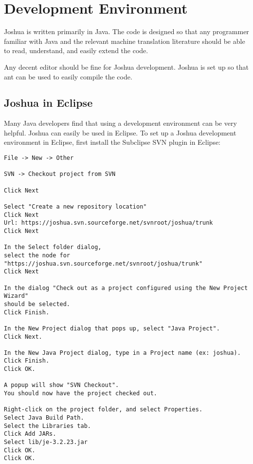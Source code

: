 \section{Development Environment}

Joshua is written primarily in Java. The code is designed so that any programmer familiar with Java and the relevant machine translation literature should be able to read, understand, and easily extend the code.

Any decent editor should be fine for Joshua development. Joshua is set up so that ant can be used to easily compile the code.

\subsection{Joshua in Eclipse}

Many Java developers find that using a development environment can be very helpful. Joshua can easily be used in Eclipse. To set up a Joshua development environment in Eclipse, first install the Subclipse SVN plugin in Eclipse:

\begin{verbatim}
File -> New -> Other

SVN -> Checkout project from SVN

Click Next

Select "Create a new repository location" 
Click Next
Url: https://joshua.svn.sourceforge.net/svnroot/joshua/trunk
Click Next

In the Select folder dialog, 
select the node for "https://joshua.svn.sourceforge.net/svnroot/joshua/trunk"
Click Next

In the dialog "Check out as a project configured using the New Project Wizard" 
should be selected.
Click Finish.

In the New Project dialog that pops up, select "Java Project".
Click Next.

In the New Java Project dialog, type in a Project name (ex: joshua).
Click Finish.
Click OK.

A popup will show "SVN Checkout".
You should now have the project checked out.

Right-click on the project folder, and select Properties.
Select Java Build Path.
Select the Libraries tab.
Click Add JARs.
Select lib/je-3.2.23.jar
Click OK.
Click OK.
\end{verbatim}
